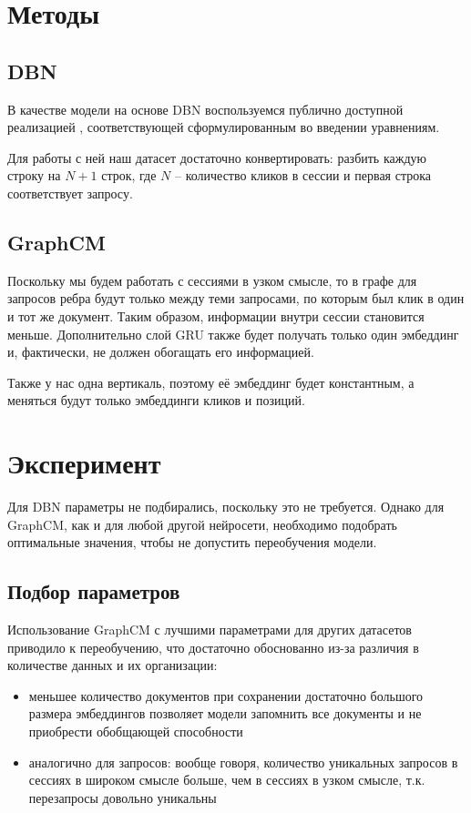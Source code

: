 \documentclass[diploma]{nanolab2015}
\begin{document}
\section{Методы}
\subsection{DBN}
В качестве модели на основе DBN воспользуемся публично доступной реализацией \cite{dbngithub}, соответствующей сформулированным во введении уравнениям.

Для работы с ней наш датасет достаточно конвертировать: разбить каждую строку на $N+1$ строк, где $N$ -- количество кликов в сессии и первая строка соответствует запросу.

\subsection{GraphCM}
Поскольку мы будем работать с сессиями в узком смысле, то в графе для запросов ребра будут только между теми запросами, по которым был клик в один и тот же документ. Таким образом, информации внутри сессии становится меньше. Дополнительно слой GRU также будет получать только один эмбеддинг и, фактически, не должен обогащать его информацией.

Также у нас одна вертикаль, поэтому её эмбеддинг будет константным, а меняться будут только эмбеддинги кликов и позиций.
\section{Эксперимент}
Для DBN параметры не подбирались, поскольку это не требуется. Однако для GraphCM, как и для любой другой нейросети, необходимо подобрать оптимальные значения, чтобы не допустить переобучения модели.
\subsection{Подбор параметров}
Использование GraphCM с лучшими параметрами для других датасетов приводило к переобучению, что достаточно обоснованно из-за различия в количестве данных и их организации:
\begin{itemize}
    \item меньшее количество документов при сохранении достаточно большого размера эмбеддингов позволяет модели запомнить все документы и не приобрести обобщающей способности
    \item аналогично для запросов: вообще говоря, количество уникальных запросов в сессиях в широком смысле больше, чем в сессиях в узком смысле, т.к. перезапросы довольно уникальны
\end{itemize}
\end{document}
